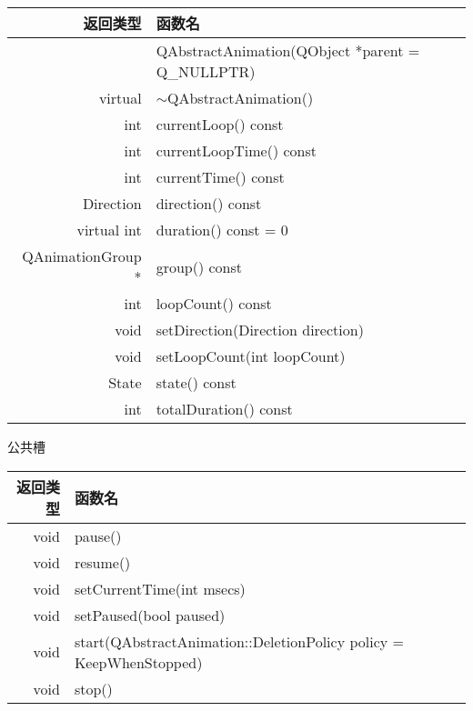 \begin{tabular}{|r|l|}

\hline
返回类型 &	函数名\\
\hline
& QAbstractAnimation(QObject *parent = Q\_NULLPTR)\\
\hline
virtual&$\sim$QAbstractAnimation()\\
\hline
int	& currentLoop() const\\
\hline
int	& currentLoopTime() const\\
\hline
int	& currentTime() const\\
\hline
Direction& direction() const\\
\hline
virtual int	&duration() const = 0\\
\hline
QAnimationGroup *&	group() const\\
\hline
int	&loopCount() const\\
\hline
void&	setDirection(Direction direction)\\
\hline
void&	setLoopCount(int loopCount)\\
\hline
State&	state() const\\
\hline
int	& totalDuration() const\\
\hline
\end{tabular}

公共槽

\begin{tabular}{|r|l|}
\hline
返回类型&	函数名 \\
\hline
void&	pause()\\
\hline
void&	resume()\\
\hline
void&	setCurrentTime(int msecs)\\
\hline
void&	setPaused(bool paused)\\
\hline
void&	start(QAbstractAnimation::DeletionPolicy policy = KeepWhenStopped)\\
\hline
void&	stop() \\
\hline
\end{tabular}


